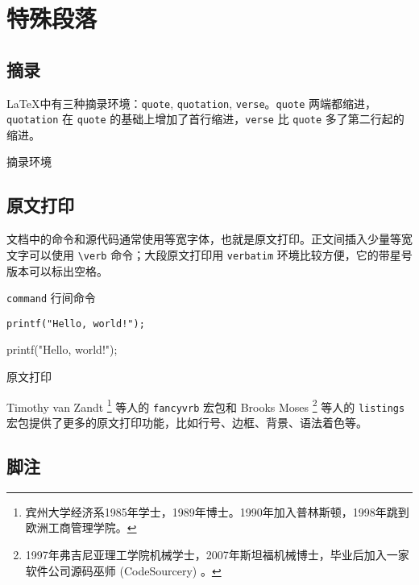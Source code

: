 \section{特殊段落}
\subsection{摘录}

\LaTeX 中有三种摘录环境：\texttt{quote}, \texttt{quotation}, \texttt{verse}。\texttt{quote} 两端都缩进， \texttt{quotation} 在 \texttt{quote} 的基础上增加了首行缩进，\texttt{verse} 比 \texttt{quote} 多了第二行起的缩进。

\begin{example}[h]
\caption{摘录环境}
\end{example}

\subsection{原文打印}
文档中的命令和源代码通常使用等宽字体，也就是原文打印。正文间插入少量等宽文字可以使用 \verb|\verb| 命令；大段原文打印用 \texttt{verbatim} 环境比较方便，它的带星号版本可以标出空格。

\begin{example}[h]
\begin{RLDemo}[numbers=left]
\verb|command| 行间命令
\begin{verbatim}
printf("Hello, world!");
\end{verbatim}
\begin{verbatim*}
printf("Hello, world!");
\end{verbatim*}
\end{RLDemo}
\caption{原文打印}
\end{example}

Timothy van Zandt\indexVanZandt{} \footnote{宾州大学经济系1985年学士，1989年博士。1990年加入普林斯顿，1998年跳到欧洲工商管理学院。} 等人的 \texttt{fancyvrb} 宏包\citep{Zandt_fancyvrb}和 Brooks Moses\indexMoses{} \footnote{1997年弗吉尼亚理工学院机械学士，2007年斯坦福机械博士，毕业后加入一家软件公司源码巫师 (CodeSourcery) 。} 等人的 \texttt{listings} 宏包\citep{Moses_listings}提供了更多的原文打印功能，比如行号、边框、背景、语法着色等。

\subsection{脚注}

